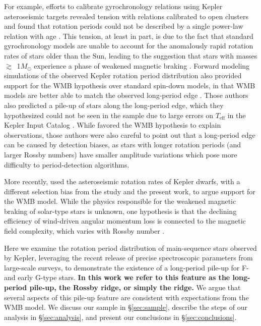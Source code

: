 \documentclass[linenumbers,tighten,trackchanges,twocolumn]{aastex631}
\newcommand{\teff}{\ensuremath{T_{\mathrm{eff}}}\xspace}
\newcommand{\msun}{$M_\odot$\xspace}
\begin{document}
For example, efforts to calibrate gyrochronology relations using Kepler asteroseismic targets revealed tension with relations calibrated to open clusters and found that rotation periods could not be described by a single power-law relation with age \citep{Angus2015}. This tension, at least in part, is due to the fact that standard gyrochronology models are unable to account for the anomalously rapid rotation rates of stars older than the Sun, leading to the suggestion that stars with masses $\gtrsim$~1\msun experience a phase of weakened magnetic braking \citep[WMB,][]{vanSaders2016}. Forward modeling simulations of the observed Kepler rotation period distribution also provided support for the WMB hypothesis over standard spin-down models, in that WMB models are better able to match the observed long-period edge \citep{vanSaders2019}. Those authors also predicted a pile-up of stars along the long-period edge, which they hypothesized could not be seen in the \citet{McQuillan2014} sample due to large errors on \teff in the Kepler Input Catalog \citep[KIC,][]{Brown2011}. While \citet{vanSaders2019} favored the WMB hypothesis to explain observations, those authors were also careful to point out that a long-period edge can be caused by detection biases, as stars with longer rotation periods (and larger Rossby numbers) have smaller amplitude variations which pose more difficulty to period-detection algorithms. 

More recently, \citet{Hall2021} used the asteroseismic rotation rates of Kepler dwarfs, with a different selection bias from the \citet{vanSaders2019} study and the present work, to argue support for the WMB model. While the physics responsible for the weakened magnetic braking of solar-type stars is unknown, one hypothesis is that the declining efficiency of wind-driven angular momentum loss is connected to the magnetic field complexity, which varies with Rossby number \citep[e.g.][]{Reville2015, vanSaders2016, Garraffo2016, Metcalfe2016, Metcalfe2019}.  

Here we examine the rotation period distribution of main-sequence stars observed by Kepler, leveraging the recent release of precise spectroscopic parameters from large-scale surveys, to demonstrate the existence of a long-period pile-up for F- and early G-type stars. \textbf{In this work we refer to this feature as the long-period pile-up, the Rossby ridge, or simply the ridge.} We argue that several aspects of this pile-up feature are consistent with expectations from the WMB model. We discuss our sample in \S\ref{sec:sample}, describe the steps of our analysis in \S\ref{sec:analysis}, and present our conclusions in \S\ref{sec:conclusions}.
\end{document}
